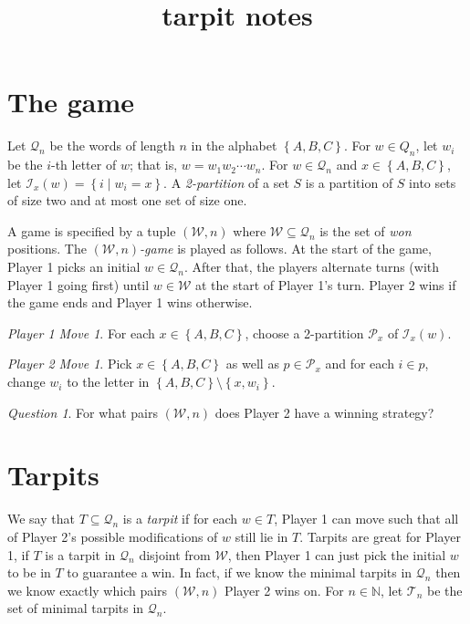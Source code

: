 \documentclass[12pt]{article}
\theoremstyle{plain}
\theoremstyle{definition}
\theoremstyle{remark}
\newtheorem*{Player1Move}{Player 1 Move}
\newtheorem*{Player2Move}{Player 2 Move}
\newtheorem*{question}{Question}
\newcommand{\fancy}[1]{\mathcal{#1}}
\newcommand{\IN}{\mathbb{N}}
\newcommand{\set}[1]{\left\{ #1 \right\}}
\newcommand{\setbs}[2]{\left\{ #1 \mid #2 \right\}}
\def\Q{\fancy{Q}}
\def\W{\fancy{W}}
\def\I{\fancy{I}}
\def\P{\fancy{P}}
\def\T{\fancy{T}}
\begin{document}
\title{tarpit notes}
\author{}
\maketitle
\section{The game}
Let $\Q_n$ be the words of length $n$ in the alphabet $\set{A, B, C}$.  For $w \in Q_n$, let $w_i$ be the $i$-th letter of $w$; that is, $w = w_1w_2\cdots w_n$. For $w \in \Q_n$ and $x \in \set{A,B,C}$, let $\I_x(w) = \setbs{i}{w_i=x}$.  A \emph{2-partition} of a set $S$ is a partition of $S$ into sets of size two and at most one set of size one.

A game is specified by a tuple $(\W, n)$ where $\W \subseteq \Q_n$ is the set of \emph{won} positions.  The \emph{$(\W, n)$-game} is played as follows.  At the start of the game, Player 1 picks an initial $w \in \Q_n$.  After that, the players alternate turns (with Player 1 going first) until $w \in \W$ at the start of Player 1's turn.  Player 2 wins if the game ends and Player 1 wins otherwise.

\begin{Player1Move}
	For each $x \in \set{A, B, C}$, choose a 2-partition $\P_x$ of $\I_x(w)$.
\end{Player1Move}

\begin{Player2Move}
	Pick $x \in \set{A, B, C}$ as well as $p \in \P_x$ and for each $i \in p$, change $w_i$ to the letter in $\set{A, B, C} \setminus \set{x, w_i}$.
\end{Player2Move}

\begin{question}
	For what pairs $(\W,n)$ does Player 2 have a winning strategy?
\end{question}

\section{Tarpits}
We say that $T \subseteq \Q_n$ is a \emph{tarpit} if for each $w \in T$, Player 1 can move such that all of Player 2's possible modifications of $w$ still lie in $T$.  Tarpits are great for Player 1, if $T$ is a tarpit in $\Q_n$ disjoint from $\W$, then Player 1 can just pick the initial $w$ to be in $T$ to guarantee a win.  In fact, if we know the minimal tarpits in $\Q_n$ then we know exactly which pairs $(\W,n)$ Player 2 wins on.  For $n \in \IN$, let $\T_n$ be the set of minimal tarpits in $\Q_n$.
\end{document}
